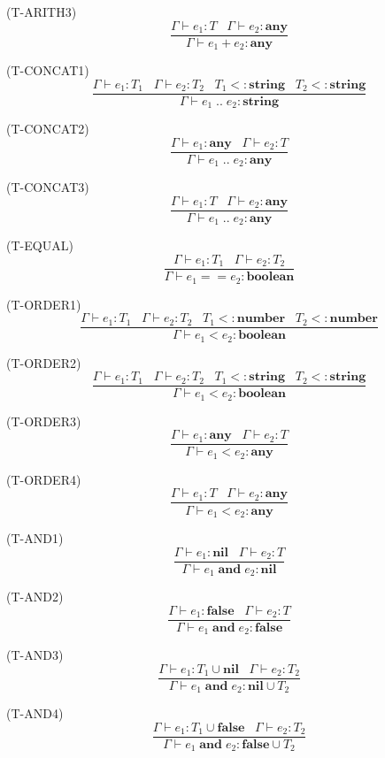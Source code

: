 \documentclass{paper}
\newcommand{\Any}{\mathbf{any}}
\newcommand{\Nil}{\mathbf{nil}}
\newcommand{\False}{\mathbf{false}}
\newcommand{\Boolean}{\mathbf{boolean}}
\newcommand{\Number}{\mathbf{number}}
\newcommand{\String}{\mathbf{string}}
\newcommand{\mylabel}[1]{\; (\textsc{#1})}
\newcommand{\env}{\Gamma}
\newcommand{\subtype}{<:}
\begin{document}
\mylabel{T-ARITH3}
\[
\dfrac{\env \vdash e_{1}:T \;\;\;
       \env \vdash e_{2}:\Any}
      {\env \vdash e_{1} + e_{2}:\Any}
\]

\mylabel{T-CONCAT1}
\[
\dfrac{\env \vdash e_{1}:T_{1} \;\;\;
       \env \vdash e_{2}:T_{2} \;\;\;
       T_{1} \subtype \String \;\;\;
       T_{2} \subtype \String}
      {\env \vdash e_{1} \; {..} \; e_{2}:\String}
\]

\mylabel{T-CONCAT2}
\[
\dfrac{\env \vdash e_{1}:\Any \;\;\;
       \env \vdash e_{2}:T}
      {\env \vdash e_{1} \; {..} \; e_{2}:\Any}
\]

\mylabel{T-CONCAT3}
\[
\dfrac{\env \vdash e_{1}:T \;\;\;
       \env \vdash e_{2}:\Any}
      {\env \vdash e_{1} \; {..} \; e_{2}:\Any}
\]

\mylabel{T-EQUAL}
\[
\dfrac{\env \vdash e_{1}:T_{1} \;\;\;
       \env \vdash e_{2}:T_{2}}
      {\env \vdash e_{1} == e_{2}:\Boolean}
\]

\mylabel{T-ORDER1}
\[
\dfrac{\env \vdash e_{1}:T_{1} \;\;\;
       \env \vdash e_{2}:T_{2} \;\;\;
       T_{1} \subtype \Number \;\;\;
       T_{2} \subtype \Number}
      {\env \vdash e_{1} < e_{2}:\Boolean}
\]

\mylabel{T-ORDER2}
\[
\dfrac{\env \vdash e_{1}:T_{1} \;\;\;
       \env \vdash e_{2}:T_{2} \;\;\;
       T_{1} \subtype \String \;\;\;
       T_{2} \subtype \String}
      {\env \vdash e_{1} < e_{2}:\Boolean}
\]

\mylabel{T-ORDER3}
\[
\dfrac{\env \vdash e_{1}:\Any \;\;\;
       \env \vdash e_{2}:T}
      {\env \vdash e_{1} < e_{2}:\Any}
\]

\mylabel{T-ORDER4}
\[
\dfrac{\env \vdash e_{1}:T \;\;\;
       \env \vdash e_{2}:\Any}
      {\env \vdash e_{1} < e_{2}:\Any}
\]

\mylabel{T-AND1}
\[
\dfrac{\env \vdash e_{1}:\Nil \;\;\;
       \env \vdash e_{2}:T}
      {\env \vdash e_{1} \; \mathbf{and} \; e_{2}:\Nil}
\]

\mylabel{T-AND2}
\[
\dfrac{\env \vdash e_{1}:\False \;\;\;
       \env \vdash e_{2}:T}
      {\env \vdash e_{1} \; \mathbf{and} \; e_{2}:\False}
\]

\mylabel{T-AND3}
\[
\dfrac{\env \vdash e_{1}:T_{1} \cup \Nil \;\;\;
       \env \vdash e_{2}:T_{2}}
      {\env \vdash e_{1} \; \mathbf{and} \; e_{2}:\Nil \cup T_{2}}
\]

\mylabel{T-AND4}
\[
\dfrac{\env \vdash e_{1}:T_{1} \cup \False \;\;\;
       \env \vdash e_{2}:T_{2}}
      {\env \vdash e_{1} \; \mathbf{and} \; e_{2}:\False \cup T_{2}}
\]
\end{document}
